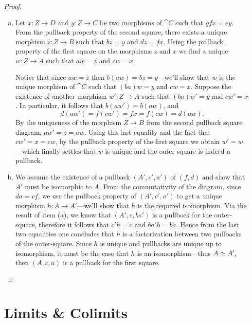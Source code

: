 \begin{proof}
\begin{enumerate}[(a)]\setlength\itemsep{0em}
\item Let \(x: Z \to D\) and \(y: Z \to C\) be two morphisms of \(\cat C\) such
  that \(g f x = e y\). From the pullback property of the second square, there
  exists a unique morphism \(z: Z \to B\) such that \(b z = y\) and
  \(d z = f x\). Using the pullback property of the first square on the
  morphisms \(z\) and \(x\) we find a unique \(w: Z \to A\) such that
  \(a w = z\) and \(c w = x\).

  Notice that since \(a w = z\) then \(b (a w) = b z = y\)---we'll show that
  \(w\) is the unique morphism of \(\cat C\) such that \((b a) w = y\) and
  \(c w = x\). Suppose the existence of another morphism \(w': Z \to A\) such
  that \((b a) w' = y\) and \(c w' = x\). In particular, it follows that \(b (a
  w') = b (a w)\), and
  \[
  d (a w') = f (c w') = f x = f (c w) = d (a w).
  \]
  By the uniqueness of the morphism \(Z \to B\) from the second pullback square
  diagram, \(a w' = z = a w\). Using this last equality and the fact that
  \(c w' = x = c w\), by the pullback property of the first square we obtain
  \(w' = w\)---which finally settles that \(w\) is unique and the outer-square
  is indeed a pullback.

\item We assume the existence of a pullback \((A', c', a')\) of \((f, d)\) and
  show that \(A'\) must be isomorphic to \(A\). From the commutativity of the
  diagram, since \(d a = c f\), we use the pullback property of \((A', c', a')\)
  to get a unique morphism \(h: A \to A'\)---we'll show that \(h\) is the
  required isomorphism. Via the result of item (a), we know that
  \((A', c, b a')\) is a pullback for the outer-square, therefore it follows
  that \(c' h = c\) and \(b a' h = b a\). Hence from the last two equalities one
  concludes that \(h\) is a factorization between two pullbacks of the
  outer-square. Since \(h\) is unique and pullbacks are unique up to
  isomorphism, it must be the case that \(h\) is an isomorphism---thus
  \(A \simeq A'\), then \((A, c, a)\) is a pullback for the first square.
\end{enumerate}
\end{proof}

\section{Limits \& Colimits}


